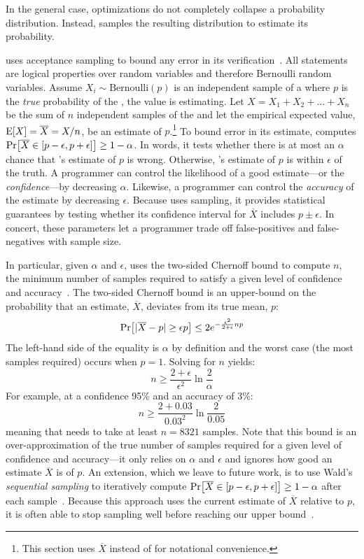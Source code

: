 In the general case, optimizations do not completely collapse a probability
distribution. Instead, \tool samples the resulting distribution to estimate its
probability.

\tool uses acceptance sampling to bound any error in its
verification~\cite{Younes}.  All \passert statements are logical
properties over random variables and therefore Bernoulli random
variables. Assume $X_i \sim \mathrm{Bernoulli}(p)$ is an independent sample of
a \passert where $p$ is the \emph{true} probability of the \passert,
the value \tool is estimating.
%
Let $X = X_1 + X_2 + \dots + X_n$ be the sum of $n$ independent
samples of the \passert and let the empirical expected value,
$\mathrm{E}\!\left[X\right] = \overline{X} = X/n$, be an estimate of $p$.\footnote{This
  section uses $\overline{X}$ instead of  for notational
  convenience.}  To bound error in its estimate, \tool computes
$\Pr\!\left[\overline{X} \in \left[p - \epsilon, p + \epsilon\right]\right] \ge 1 - \alpha$.
In words, it tests whether there is at most an $\alpha$ chance that \tool's
estimate of $p$ is wrong. Otherwise, \tool's estimate of $p$ is within
$\epsilon$ of the truth.  A programmer can control the likelihood of a
good estimate---or the \emph{confidence}---by decreasing $\alpha$.
Likewise, a programmer can control the \emph{accuracy} of the estimate
by decreasing $\epsilon$. Because \tool uses sampling, it provides
statistical guarantees by testing whether its confidence
interval for $\overline{X}$ includes $p \pm
\epsilon$.  In concert, these parameters let a programmer trade off
false-positives and false-negatives with sample size.

In particular, given $\alpha$ and $\epsilon$, \tool uses the two-sided
Chernoff bound to compute $n$, the minimum number of samples required
to satisfy a given level of confidence and
accuracy~\cite{chernoff1952measure}. The two-sided Chernoff bound is
an upper-bound on the probability that an estimate, $\overline{X}$,
deviates from its true mean, $p$:
%
$$\Pr\!\left[|\overline{X} - p| \ge \epsilon p\right] \le 2 e^{-\frac{\epsilon^2}{2 + \epsilon} np}$$
%
The left-hand side of the equality is $\alpha$ by definition and the worst
case (the most samples required) occurs when $p = 1$. Solving for $n$ yields:
%
$$n \ge \frac{2+\epsilon}{\epsilon^2}\ln\frac{2}{\alpha}$$
%
For example, at a confidence 95\% and an accuracy of 3\%:
%
$$n \ge \frac{2+0.03}{0.03^2}\ln\frac{2}{0.05}$$
%
meaning that \tool needs to take at least $n=8321$ samples.  Note that this bound
is an over-approximation of the true number of samples required for a
given level of confidence and accuracy---it only relies on $\alpha$
and $\epsilon$ and ignores how good an estimate $\overline{X}$ is of $p$.
An extension, which we leave to future work, is to use Wald's
\emph{sequential sampling} to iteratively compute $\Pr\!\left[\overline{X}
    \in [p - \epsilon, p + \epsilon]\right] \ge 1 - \alpha$ after each
sample~\cite{wald1945sequential}. Because this approach uses the
current estimate of $\overline{X}$ relative to $p$, it is often able to
stop sampling well before reaching our
upper bound~\cite{Younes20061368}.

